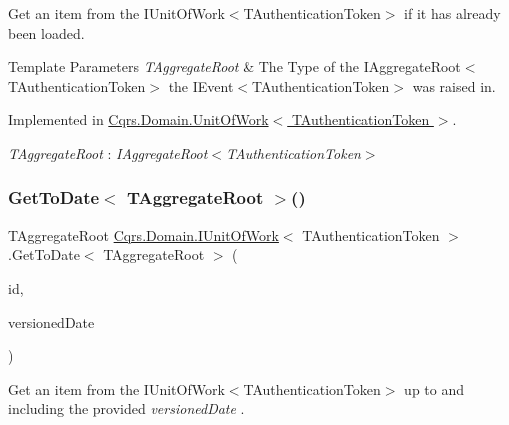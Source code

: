 Get an item from the I\+Unit\+Of\+Work$<$\+T\+Authentication\+Token$>$ if it has already been loaded. 


\begin{DoxyTemplParams}{Template Parameters}
{\em T\+Aggregate\+Root} & The Type of the I\+Aggregate\+Root$<$\+T\+Authentication\+Token$>$ the I\+Event$<$\+T\+Authentication\+Token$>$ was raised in.\\
\hline
\end{DoxyTemplParams}


Implemented in \hyperlink{classCqrs_1_1Domain_1_1UnitOfWork_a72f0ec98b1ea4b74af7d0daa5cb73c03_a72f0ec98b1ea4b74af7d0daa5cb73c03}{Cqrs.\+Domain.\+Unit\+Of\+Work$<$ T\+Authentication\+Token $>$}.

\begin{Desc}
\item[Type Constraints]\begin{description}
\item[{\em T\+Aggregate\+Root} : {\em I\+Aggregate\+Root$<$T\+Authentication\+Token$>$}]\end{description}
\end{Desc}
\mbox{\label{interfaceCqrs_1_1Domain_1_1IUnitOfWork_a9878de7ddb925b1ef2193b8734d79a3a_a9878de7ddb925b1ef2193b8734d79a3a}} 
\subsubsection{\texorpdfstring{Get\+To\+Date$<$ T\+Aggregate\+Root $>$()}{GetToDate< TAggregateRoot >()}}
{\footnotesize\ttfamily T\+Aggregate\+Root \hyperlink{interfaceCqrs_1_1Domain_1_1IUnitOfWork}{Cqrs.\+Domain.\+I\+Unit\+Of\+Work}$<$ T\+Authentication\+Token $>$.Get\+To\+Date$<$ T\+Aggregate\+Root $>$ (\begin{DoxyParamCaption}\item[{Guid}]{id,  }\item[{Date\+Time}]{versioned\+Date }\end{DoxyParamCaption})}



Get an item from the I\+Unit\+Of\+Work$<$\+T\+Authentication\+Token$>$ up to and including the provided {\itshape versioned\+Date} . 



